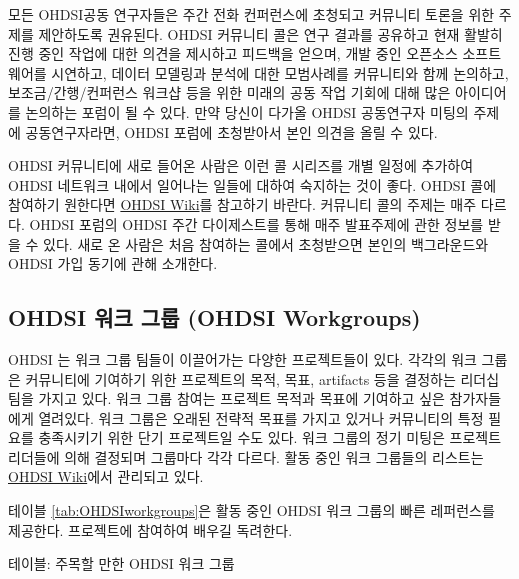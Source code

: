 \documentclass[11pt]{book}
\theoremstyle{definition}
\theoremstyle{definition}
\theoremstyle{definition}
\theoremstyle{remark}
\begin{document}
모든 OHDSI공동 연구자들은 주간 전화 컨퍼런스에 초청되고 커뮤니티 토론을
위한 주제를 제안하도록 권유된다. OHDSI 커뮤니티 콜은 연구 결과를
공유하고 현재 활발히 진행 중인 작업에 대한 의견을 제시하고 피드백을
얻으며, 개발 중인 오픈소스 소프트웨어를 시연하고, 데이터 모델링과 분석에
대한 모범사례를 커뮤니티와 함께 논의하고, 보조금/간행/컨퍼런스 워크샵
등을 위한 미래의 공동 작업 기회에 대해 많은 아이디어를 논의하는 포럼이
될 수 있다. 만약 당신이 다가올 OHDSI 공동연구자 미팅의 주제에
공동연구자라면, OHDSI 포럼에 초청받아서 본인 의견을 올릴 수 있다.

OHDSI 커뮤니티에 새로 들어온 사람은 이런 콜 시리즈를 개별 일정에
추가하여 OHDSI 네트워크 내에서 일어나는 일들에 대하여 숙지하는 것이
좋다. OHDSI 콜에 참여하기 원한다면
\href{https://www.ohdsi.org/web/wiki/doku.php?id=projects:ohdsi_community}{OHDSI
Wiki}를 참고하기 바란다. 커뮤니티 콜의 주제는 매주 다르다. OHDSI 포럼의
OHDSI 주간 다이제스트를 통해 매주 발표주제에 관한 정보를 받을 수 있다.
새로 온 사람은 처음 참여하는 콜에서 초청받으면 본인의 백그라운드와 OHDSI
가입 동기에 관해 소개한다. 

\subsection{OHDSI 워크 그룹 (OHDSI
Workgroups)}\label{ohdsi---ohdsi-workgroups}

OHDSI 는 워크 그룹 팀들이 이끌어가는 다양한 프로젝트들이 있다. 각각의
워크 그룹은 커뮤니티에 기여하기 위한 프로젝트의 목적, 목표, artifacts
등을 결정하는 리더십 팀을 가지고 있다. 워크 그룹 참여는 프로젝트 목적과
목표에 기여하고 싶은 참가자들에게 열려있다. 워크 그룹은 오래된 전략적
목표를 가지고 있거나 커뮤니티의 특정 필요를 충족시키기 위한 단기
프로젝트일 수도 있다. 워크 그룹의 정기 미팅은 프로젝트 리더들에 의해
결정되며 그룹마다 각각 다르다. 활동 중인 워크 그룹들의 리스트는
\href{https://www.ohdsi.org/web/wiki/doku.php?id=projects:overview}{OHDSI
Wiki}에서 관리되고 있다. 

테이블 \ref{tab:OHDSIworkgroups}은 활동 중인 OHDSI 워크 그룹의 빠른
레퍼런스를 제공한다. 프로젝트에 참여하여 배우길 독려한다.

테이블: \label{tab:OHDSIworkgroups} 주목할 만한 OHDSI 워크 그룹
\end{document}

